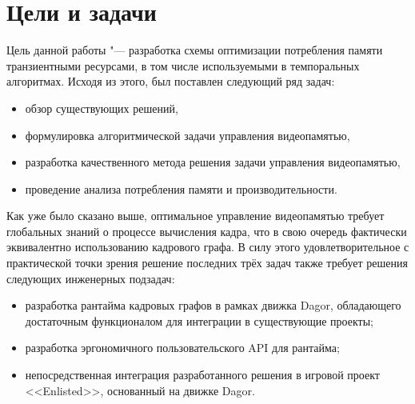 \section{Цели и задачи}
Цель данной работы "--- разработка схемы оптимизации потребления памяти транзиентными ресурсами, в том числе используемыми в темпоральных алгоритмах. Исходя из этого, был поставлен следующий ряд задач:
\begin{itemize}
    \item обзор существующих решений,
    \item формулировка алгоритмической задачи управления видеопамятью,
    \item разработка качественного метода решения задачи управления видеопамятью,
    \item проведение анализа потребления памяти и производительности.
\end{itemize}
Как уже было сказано выше, оптимальное управление видеопамятью требует глобальных знаний о процессе вычисления кадра, что в свою очередь фактически эквивалентно использованию кадрового графа.
В силу этого удовлетворительное с практической точки зрения решение последних трёх задач также требует решения следующих инженерных подзадач:
\begin{itemize}
    \item разработка рантайма кадровых графов в рамках движка Dagor, обладающего достаточным функционалом для интеграции в существующие проекты;
    \item разработка эргономичного пользовательского API для рантайма;
    \item непосредственная интеграция разработанного решения в игровой проект <<Enlisted>>, основанный на движке Dagor.
\end{itemize}

